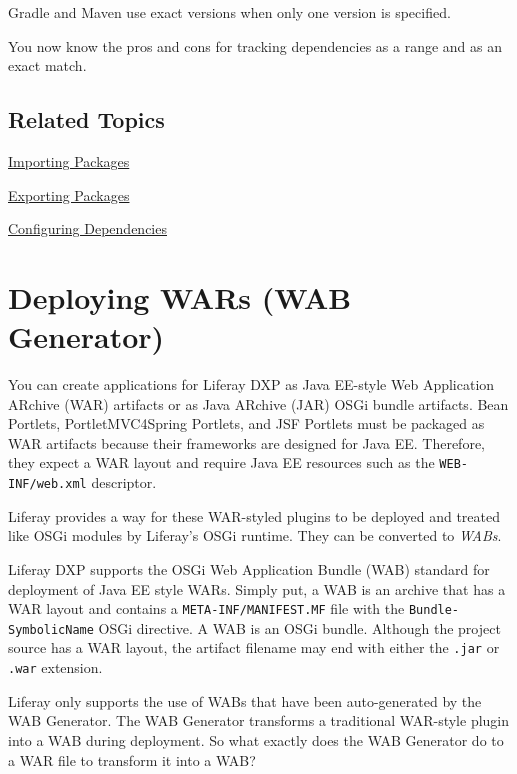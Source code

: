 Gradle and Maven use exact versions when only one version is specified.

\noindent\hrulefill

You now know the pros and cons for tracking dependencies as a range and
as an exact match.

\section{Related Topics}\label{related-topics-6}

\href{/docs/7-2/customization/-/knowledge_base/c/importing-packages}{Importing
Packages}

\href{/docs/7-2/customization/-/knowledge_base/c/exporting-packages}{Exporting
Packages}

\href{/docs/7-2/customization/-/knowledge_base/c/configuring-dependencies}{Configuring
Dependencies}

\chapter{Deploying WARs (WAB
Generator)}\label{deploying-wars-wab-generator}

You can create applications for Liferay DXP as Java EE-style Web
Application ARchive (WAR) artifacts or as Java ARchive (JAR) OSGi bundle
artifacts. Bean Portlets, PortletMVC4Spring Portlets, and JSF Portlets
must be packaged as WAR artifacts because their frameworks are designed
for Java EE. Therefore, they expect a WAR layout and require Java EE
resources such as the \texttt{WEB-INF/web.xml} descriptor.

Liferay provides a way for these WAR-styled plugins to be deployed and
treated like OSGi modules by Liferay's OSGi runtime. They can be
converted to \emph{WABs}.

Liferay DXP supports the OSGi Web Application Bundle (WAB) standard for
deployment of Java EE style WARs. Simply put, a WAB is an archive that
has a WAR layout and contains a \texttt{META-INF/MANIFEST.MF} file with
the \texttt{Bundle-SymbolicName} OSGi directive. A WAB is an OSGi
bundle. Although the project source has a WAR layout, the artifact
filename may end with either the \texttt{.jar} or \texttt{.war}
extension.

Liferay only supports the use of WABs that have been auto-generated by
the WAB Generator. The WAB Generator transforms a traditional WAR-style
plugin into a WAB during deployment. So what exactly does the WAB
Generator do to a WAR file to transform it into a WAB?


